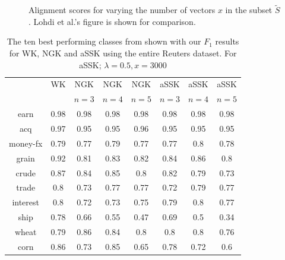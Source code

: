 \begin{figure}[h]
	\centering
	\caption{Alignment scores for varying the number of vectors $ x $ in the subset $ \tilde{S} $. Lohdi et al.'s figure is shown for comparison.\label{fig:alignment}}
\end{figure}
\begin{table}
	\centering
	\small	
	\begin{tabular}{| c | c | c | c | c | c | c | c |}\hline
		& WK & NGK & NGK  & NGK  & aSSK & aSSK& aSSK \\ 
		&  & $n = 3$& $ n = 4 $ & $ n = 5 $ & $ n = 3 $& $ n = 4 $ & $ n = 5 $ \\ \hline
		earn & 0.98 & 0.98 &  0.98&  0.98 & 0.98 & 0.98 & 0.98 \\ \hline
		acq & 0.97 & 0.95 &  0.95 &  0.96 & 0.95 & 0.95 & 0.95 \\ \hline
		money-fx & 0.79 & 0.77 &  0.79 & 0.77 & 0.77 & 0.8 & 0.78 \\ \hline
		grain & 0.92 & 0.81 &  0.83& 0.82 & 0.84 & 0.86 & 0.8 \\ \hline
		crude & 0.87 & 0.84 &  0.85 & 0.8 & 0.82 & 0.79 & 0.73 \\ \hline
		trade & 0.8 & 0.73 &  0.77 & 0.77 & 0.72 & 0.79 & 0.77 \\ \hline
		interest & 0.8 & 0.72 &  0.73 & 0.75 & 0.79 & 0.8 & 0.77 \\ \hline
		ship & 0.78 & 0.66 &  0.55 & 0.47 & 0.69 & 0.5 & 0.34 \\ \hline
		wheat & 0.79 & 0.86 &  0.84 & 0.8 & 0.8 & 0.8 & 0.76 \\ \hline
		corn & 0.86 & 0.73 &  0.85 & 0.65 & 0.78 & 0.72 & 0.6 \\ \hline	
	\end{tabular}
	\caption{The ten best performing classes from \cite{lodhi} shown with our $ F_1 $ results for WK, NGK and  aSSK using the entire Reuters dataset. For aSSK; $ \lambda = 0.5, x = 3000$\label{tab:full_data} }
\end{table}

